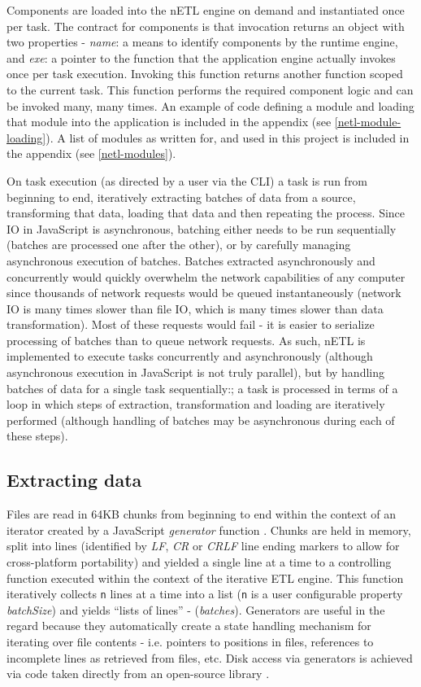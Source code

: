 Components are loaded into the nETL engine on demand and instantiated once per task. The contract for components is that invocation returns an object with two properties - \textit{name}: a means to identify components by the runtime engine, and \textit{exe}: a pointer to the function that the application engine actually invokes once per task execution. Invoking this function returns another function scoped to the current task. This function performs the required component logic and can be invoked many, many times. An example of code defining a module and loading that module into the application is included in the appendix (see \ref{netl-module-loading}). A list of modules as written for, and used in this project is included in the appendix (see \ref{netl-modules}).

On task execution (as directed by a user via the CLI) a task is run from beginning to end, iteratively extracting batches of data from a source, transforming that data, loading that data and then repeating the process. Since IO in JavaScript is asynchronous, batching either needs to be run sequentially (batches are processed one after the other), or by carefully managing asynchronous execution of batches. Batches extracted asynchronously and concurrently would quickly overwhelm the network capabilities of any computer since thousands of network requests would be queued instantaneously (network IO is many times slower than file IO, which is many times slower than data transformation). Most of these requests would fail - it is easier to serialize processing of batches than to queue network requests. As such, nETL is implemented to execute tasks concurrently and asynchronously (although asynchronous execution in JavaScript is not truly parallel), but by handling batches of data for a single task sequentially:; a task is processed in terms of a loop in which steps of extraction, transformation and loading are iteratively performed (although handling of batches may be asynchronous during each of these steps).

\subsection{Extracting data}
Files are read in 64KB chunks from beginning to end within the context of an iterator created by a JavaScript \textit{generator} function \cite{mozillaGenerators}. Chunks are held in memory, split into lines (identified by \textit{LF}, \textit{CR} or \textit{CRLF} line ending markers to allow for cross-platform portability) and yielded a single line at a time to a controlling function executed within the context of the iterative ETL engine. This function iteratively collects \texttt{n} lines at a time into a list (\texttt{n} is a user configurable property \textit{batchSize}) and yields ``lists of lines'' - (\textit{batches}). Generators are useful in the regard because they automatically create a state handling mechanism for iterating over file contents - i.e. pointers to positions in files, references to incomplete lines as retrieved from files, etc. Disk access via generators is achieved via code taken directly from an open-source library \cite{bower16}.

